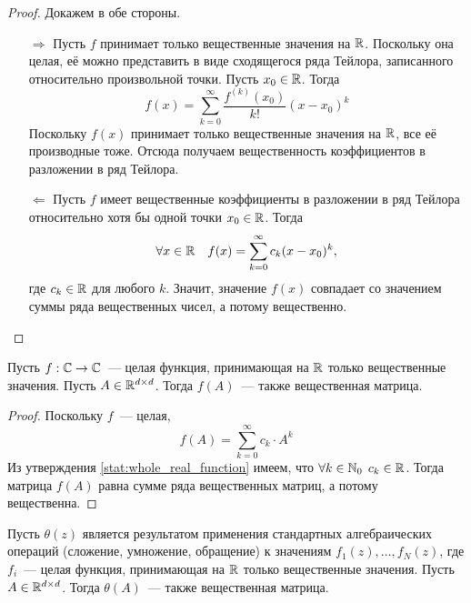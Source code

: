 \begin{proof}
    Докажем в обе стороны.
    \begin{itemize}
        \item[$ \Rightarrow $]
            Пусть $ f $ принимает только вещественные значения на $ \mathbb{R} $.
            Поскольку она целая, её можно представить в виде сходящегося ряда Тейлора,
            записанного относительно произвольной точки.
            Пусть $ x_0 \in \mathbb{R} $.
            Тогда
            \[
                f(x) = \sum_{k=0}^{\infty} \frac{f^{(k)}(x_0)}{k!} (x - x_0)^k
            \]
            Поскольку $ f(x) $ принимает только вещественные значения на $ \mathbb{R} $,
            все её производные тоже.
            Отсюда получаем вещественность коэффициентов в разложении в ряд Тейлора.
        \item[$ \Leftarrow $]
            Пусть $ f $ имеет вещественные коэффициенты в разложении в ряд Тейлора относительно хотя бы одной точки $ x_0 \in \mathbb{R} $.
            Тогда
            \[
                \forall x \in \mathbb{R} \quad f(x) = \sum_{k=0}^{\infty} c_k (x - x_0)^k,
            \]
            где $ c_k \in \mathbb{R} $ для любого $ k $.
            Значит, значение $ f(x) $ совпадает со значением суммы ряда вещественных чисел,
            а потому вещественно.
    \end{itemize}
\end{proof}

\begin{lemma}
    \label{lem:whole_real_function_matrix}
    Пусть $ f: \mathbb{C} \to \mathbb{C} $~--- целая функция, принимающая на $ \mathbb{R} $ только вещественные значения.
    Пусть $ A \in \mathbb{R}^{d \times d} $.
    Тогда $ f(A) $~--- также вещественная матрица.
\end{lemma}

\begin{proof}
    Поскольку $ f $~--- целая,
    \[
        f(A) = \sum_{k=0}^{\infty} c_k \cdot A^k
    \]
    Из утверждения \ref{stat:whole_real_function} имеем, что $ \forall k \in \mathbb{N}_0 \;\, c_k \in \mathbb{R} $.
    Тогда матрица $ f(A) $ равна сумме ряда вещественных матриц, а потому вещественна.
\end{proof}

\begin{corollary}
    \label{cor:real_matrix}
    Пусть $ \theta(z) $ является результатом применения стандартных алгебраических операций (сложение, умножение, обращение)
    к значениям $ f_1(z), \ldots, f_N(z) $, где $ f_i $~--- целая функция, принимающая на $ \mathbb{R} $ только вещественные значения.
    Пусть $ A \in \mathbb{R}^{d \times d} $.
    Тогда $ \theta(A) $~--- также вещественная матрица.
\end{corollary}



